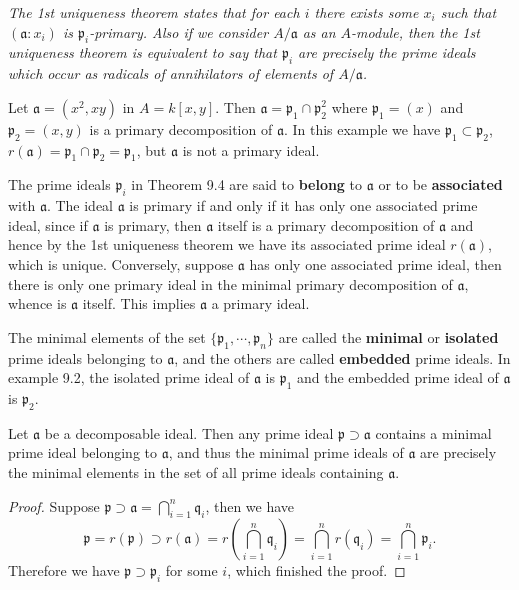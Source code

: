 \begin{note}\em
The 1st uniqueness theorem states that for each $i$ there exists some $x_i$ such that $(\mathfrak{a}:x_i)$ is $\mathfrak{p}_i$-primary. Also if we consider $A/\mathfrak{a}$ as an $A$-module, then the 1st uniqueness theorem is equivalent to say that $\mathfrak{p}_i$ are precisely the prime ideals which occur as radicals of annihilators of elements of $A/\mathfrak{a}$.
\end{note}
\begin{example}
Let $\mathfrak{a}=(x^2,xy)$ in $A=k[x,y]$. Then $\mathfrak{a}=\mathfrak{p}_1\cap\mathfrak{p}_2^2$ where $\mathfrak{p}_1=(x)$ and $\mathfrak{p}_2=(x,y)$ is a primary decomposition of $\mathfrak{a}$. In this example we have $\mathfrak{p}_1\subset\mathfrak{p}_2$, $r(\mathfrak{a})=\mathfrak{p}_1\cap\mathfrak{p}_2=\mathfrak{p}_1$, but $\mathfrak{a}$ is not a primary ideal.
\end{example}
The prime ideals $\mathfrak{p}_i$ in Theorem 9.4 are said to \textbf{belong} to $\mathfrak{a}$ or to be \textbf{associated} with $\mathfrak{a}$. The ideal $\mathfrak{a}$ is primary if and only if it has only one associated prime ideal, since if $\mathfrak{a}$ is primary, then $\mathfrak{a}$ itself is a primary decomposition of $\mathfrak{a}$ and hence by the 1st uniqueness theorem we have its associated prime ideal $r(\mathfrak{a})$, which is unique. Conversely, suppose $\mathfrak{a}$ has only one associated prime ideal, then there is only one primary ideal in the minimal primary decomposition of $\mathfrak{a}$, whence is $\mathfrak{a}$ itself. This implies $\mathfrak{a}$ a primary ideal.\par
The minimal elements of the set $\{\mathfrak{p}_1,\cdots,\mathfrak{p}_n\}$ are called the \textbf{minimal} or \textbf{isolated} prime ideals belonging to $\mathfrak{a}$, and the others are called \textbf{embedded} prime ideals. In example 9.2, the isolated prime ideal of $\mathfrak{a}$ is $\mathfrak{p}_1$ and the embedded prime ideal of $\mathfrak{a}$ is $\mathfrak{p}_2$.
\begin{proposition}
Let $\mathfrak{a}$ be a decomposable ideal. Then any prime ideal $\mathfrak{p}\supset\mathfrak{a}$ contains a minimal prime ideal belonging to $\mathfrak{a}$, and thus the minimal prime ideals of $\mathfrak{a}$ are precisely the minimal elements in the set of all prime ideals containing $\mathfrak{a}$.
\end{proposition}
\begin{proof}
Suppose $\mathfrak{p}\supset\mathfrak{a}=\bigcap_{i=1}^n\mathfrak{q}_i$, then we have 
$$
\mathfrak{p} =r\left( \mathfrak{p} \right) \supset r\left( \mathfrak{a} \right) =r\left( \bigcap_{i=1}^n{\mathfrak{q} _i} \right) =\bigcap_{i=1}^n{r\left( \mathfrak{q} _i \right)}=\bigcap_{i=1}^n{\mathfrak{p} _i}.
$$
Therefore we have $\mathfrak{p}\supset\mathfrak{p}_i$ for some $i$, which finished the proof.
\end{proof}
